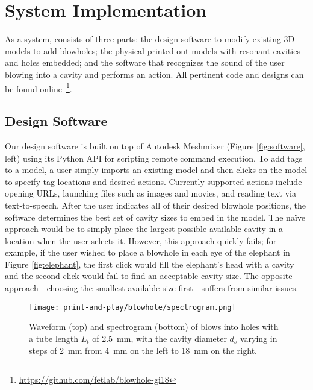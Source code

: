   \section{System Implementation}
    As a system, \bh consists of three parts: the design software to modify
    existing 3D models to add blowholes; the physical printed-out models with
    resonant cavities and holes embedded; and the software that recognizes the
    sound of the user blowing into a cavity and performs an action. All
    pertinent code and designs can be found
    online~\footnote{\url{https://github.com/fetlab/blowhole-gi18}}.
          
    \subsection{Design Software}
      Our design software is built on top of Autodesk Meshmixer (Figure
      \ref{fig:software}, left) using its Python API for scripting remote
      command execution. To add \bh tags to a model, a user simply imports an
      existing model and then clicks on the model to specify tag locations and
      desired actions. Currently supported actions include opening URLs,
      launching files such as images and movies, and reading text via
      text-to-speech. After the user indicates all of their desired blowhole
      positions, the software determines the best set of cavity sizes to embed
      in the model. The na\"ive approach would be to simply place the largest
      possible available cavity in a location when the user selects it. However,
      this approach quickly fails; for example, if the user wished to place a
      blowhole in each eye of the elephant in Figure \ref{fig:elephant}, the
      first click would fill the elephant's head with a cavity and the second
      click would fail to find an acceptable cavity size. The opposite
      approach---choosing the smallest available size first---suffers from
      similar issues. 
      
      \begin{figure*}[t]
        \centering
        \texttt{[image: print-and-play/blowhole/spectrogram.png]}
        \caption{Waveform (top) and spectrogram (bottom) of blows into holes with a tube length $L_t$ of 2.5~mm, with the cavity diameter $d_s$ varying in steps of 2~mm from 4~mm on the left to 18~mm on the right.}
        \label{fig:spectrogram}
      \end{figure*}

